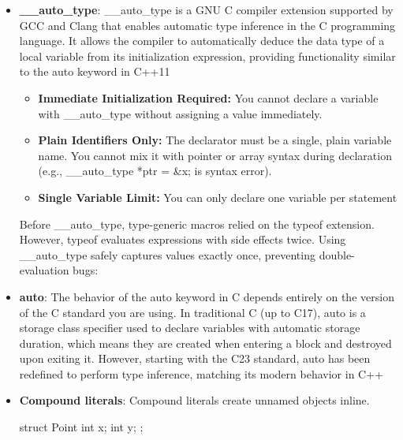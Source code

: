 \documentclass{report}
\begin{document}
\begin{itemize}
\begin{cppcode}
                    // 0, 0, 1, 0, 0, 6, 0, 0, 0, 0, 
                    for (__auto_type i = 0; i < 10; ++i) 
                    printf("%
                \end{cppcode}
            \item \textbf{\_\_auto\_type}: \_\_auto\_type is a GNU C compiler extension supported by GCC and Clang that enables automatic type inference in the C programming language. It allows the compiler to automatically deduce the data type of a local variable from its initialization expression, providing functionality similar to the auto keyword in C++11
                \begin{itemize}
                    \item \textbf{Immediate Initialization Required:} You cannot declare a variable with \_\_auto\_type without assigning a value immediately.
                    \item \textbf{Plain Identifiers Only:} The declarator must be a single, plain variable name. You cannot mix it with pointer or array syntax during declaration (e.g., \_\_auto\_type *ptr = \&x; is syntax error).
                    \item \textbf{Single Variable Limit:} You can only declare one variable per statement
                \end{itemize}
                Before \_\_auto\_type, type-generic macros relied on the typeof extension. However, typeof evaluates expressions with side effects twice. Using \_\_auto\_type safely captures values exactly once, preventing double-evaluation bugs:
            \item \textbf{auto}: The behavior of the auto keyword in C depends entirely on the version of the C standard you are using. In traditional C (up to C17), auto is a storage class specifier used to declare variables with automatic storage duration, which means they are created when entering a block and destroyed upon exiting it. However, starting with the C23 standard, auto has been redefined to perform type inference, matching its modern behavior in C++
            \item \textbf{Compound literals}: Compound literals create unnamed objects inline.
                \bigbreak \noindent 
                \begin{cppcode}
                    struct Point {
                        int x;
                        int y;
                    };


\end{cppcode}
\end{itemize}
\end{document}
